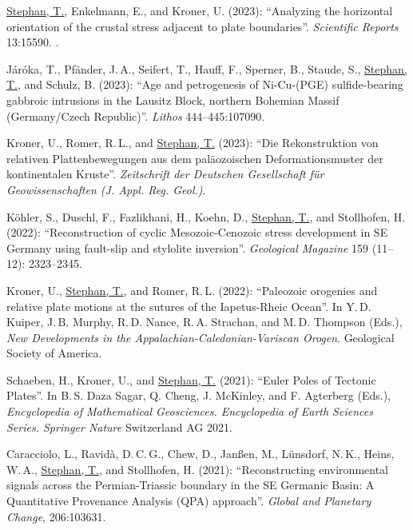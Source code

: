 \documentclass[10pt, paper=letter]{scrartcl} %
\begin{document}
\begin{cv}{}
\begin{cvlist}{}
        \item[12] \ul{Stephan, T.}, Enkelmann, E., and Kroner, U. (2023): \enquote{Analyzing the horizontal orientation of the crustal stress adjacent to plate boundaries}. \textit{Scientific Reports} 13:15590. .
        \item[11] Járóka, T.,  Pfänder, J.\,A., Seifert, T., Hauff, F., Sperner, B., Staude, S., \ul{Stephan, T.}, and Schulz, B. (2023): \enquote{Age and petrogenesis of Ni-Cu-(PGE) sulfide-bearing gabbroic intrusions in the Lausitz Block, northern Bohemian Massif (Germany/Czech Republic)}. \textit{Lithos} 444--445:107090. 
        \item[10] Kroner, U., Romer, R.\,L., and \ul{Stephan, T.} (2023): \enquote{Die Rekonstruktion von relativen Plattenbewegungen aus dem paläozoischen Deformationsmuster der kontinentalen Kruste}. \textit{Zeitschrift der Deutschen Gesellschaft für Geowissenschaften (J. Appl. Reg. Geol.)}. 
        \item[9] K\"ohler, S., Duschl, F., Fazlikhani, H., Koehn, D., \ul{Stephan, T.}, and Stollhofen, H. (2022): \enquote{Reconstruction of cyclic Mesozoic-Cenozoic stress development in SE Germany using fault-slip and stylolite inversion}. \textit{Geological Magazine} 159 (11--12): 2323--2345. 
        \item[8] Kroner, U., \ul{Stephan, T.}, and Romer, R.\,L. (2022): \enquote{Paleozoic orogenies and relative plate motions at the sutures of the Iapetus-Rheic Ocean}. In Y.\,D. Kuiper, J.\,B. Murphy, R.\,D. Nance, R.\,A. Strachan, and M.\,D. Thompson (Eds.), \textit{New Developments in the Appalachian-Caledonian-Variscan Orogen}. Geological Society of America. 
        \item[7] Schaeben, H., Kroner, U., and \ul{Stephan, T.} (2021): \enquote{Euler Poles of Tectonic Plates}. In B.\,S. Daza Sagar, Q. Cheng, J. McKinley, and F. Agterberg (Eds.), \textit{Encyclopedia of Mathematical Geosciences. Encyclopedia of Earth Sciences Series. Springer Nature} Switzerland AG 2021. 
        \item[6] Caracciolo, L., Ravid\`a, D.\,C.\,G., Chew, D., Jan{\ss}en, M., L\"unsdorf, N.\,K., Heins, W.\,A., \ul{Stephan, T.}, and Stollhofen, H. (2021): \enquote{Reconstructing environmental signals across the Permian-Triassic boundary in the SE Germanic Basin: A Quantitative Provenance Analysis (QPA) approach}. \textit{Global and Planetary Change}, 206:103631.  

\end{cvlist}
\end{cv}
\end{document}

